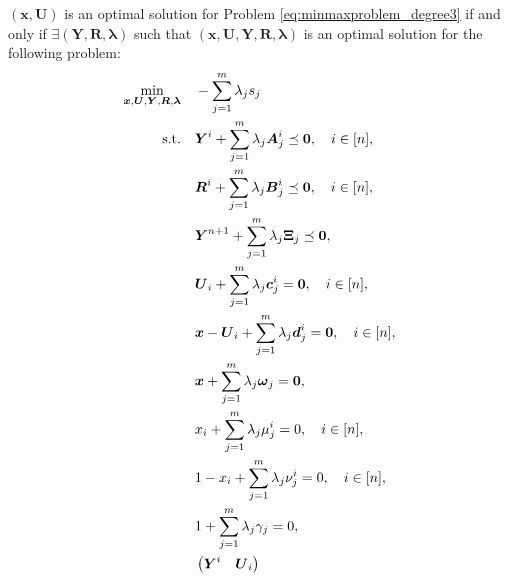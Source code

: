 \documentclass[opre,nonblindrev]{informs3} %
\begin{document}
\begin{theorem}
\label{thm:reformulation_degree3}
{\color{black} $\left(\boldsymbol{x},\boldsymbol{U}\right)$ is an optimal solution for Problem \eqref{eq:minmaxproblem_degree3} if and only if $\exists \left( \boldsymbol{Y}, \boldsymbol{R}, \boldsymbol{\lambda} \right)$ such that $\left(\boldsymbol{x},\boldsymbol{U},\boldsymbol{Y},\boldsymbol{R},\boldsymbol{\lambda}\right)$ is an optimal solution for the following problem:}   
\begin{subequations}
			\begin{align}
				\displaystyle \min_{\boldsymbol{x}, \boldsymbol{U}, \boldsymbol{Y}, \boldsymbol{R}, \boldsymbol{\lambda}} &\quad - \sum_{j=1}^{m} \lambda_j s_j \nonumber \\
				{\rm s.t.} &\quad \boldsymbol{Y}^i + \sum_{j=1}^{m} \lambda_j \boldsymbol{A}_j^i \preceq \boldsymbol{0}, \quad i \in [n], \label{eq:best_slc_degree3_a} \\ 
                &\quad \boldsymbol{R}^i + \sum_{j=1}^{m} \lambda_j \boldsymbol{B}_j^i \preceq \boldsymbol{0}, \quad i \in [n],  \label{eq:best_slc_degree3_b} \\ 
                &\quad \boldsymbol{Y}^{n+1} + \sum_{j=1}^{m} \lambda_j \boldsymbol{\Xi}_j \preceq \boldsymbol{0}, \label{eq:best_slc_degree3_c} \\ 
                 &\quad \boldsymbol{U}_i + \sum_{j=1}^{m} \lambda_j \boldsymbol{c}_j^i = \boldsymbol{0}, \quad i \in [n], \label{eq:best_slc_degree3_d} \\ 
                &\quad \boldsymbol{x}-\boldsymbol{U}_i + \sum_{j=1}^{m} \lambda_j \boldsymbol{d}_j^i = \boldsymbol{0}, \quad i \in [n], \label{eq:best_slc_degree3_e} \\  
                &\quad \boldsymbol{x} + \sum_{j=1}^{m} \lambda_j \boldsymbol{\omega}_j = \boldsymbol{0}, \label{eq:best_slc_degree3_f} \\ 
                &\quad x_i + \sum_{j=1}^{m} \lambda_j \mu_j^i = 0, \quad i \in [n], \label{eq:best_slc_degree3_g} \\ 
                &\quad 1-x_i + \sum_{j=1}^{m} \lambda_j \nu_j^i = 0, \quad i \in [n], \label{eq:best_slc_degree3_h} \\ 
                &\quad 1 + \sum_{j=1}^{m} \lambda_j \gamma_j = 0, \label{eq:best_slc_degree3_i} \\ 
                &\quad \begin{pmatrix}
                        \boldsymbol{Y}^i & \boldsymbol{U}_i \\

\end{pmatrix}
\end{align}
\end{subequations}
\end{theorem}
\end{document}
